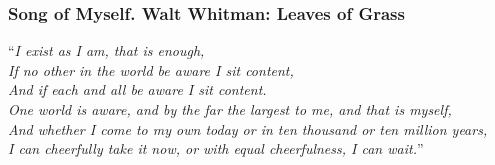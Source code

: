 

\begin{frame}
\frametitle{Song of Myself.  Walt Whitman: Leaves of Grass}
``\textit{I exist as I am, that is enough, \\
If no other in the world be aware I sit content,\\
And if each and all be aware I sit content.\\
One world is aware, and by the far the largest to me, and that is myself,\\
And whether I come to my own today or in ten thousand or ten million years,\\
I can cheerfully take it now, or with equal cheerfulness, I can wait.}''
\end{frame}
